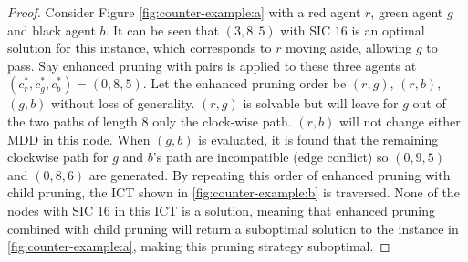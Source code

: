 \documentclass[english]{article}
\begin{document}
	\begin{proof}
		Consider Figure \ref{fig:counter-example:a} with a red agent $r$, green agent $g$ and black agent $b$. It can be seen that $(3,8,5)$ with SIC $16$ is an optimal solution for this instance, which corresponds to $r$ moving aside, allowing $g$ to pass.  Say enhanced pruning with pairs is applied to these three agents at $(c^*_r,c^*_g,c^*_b) = (0,8,5)$. Let the enhanced pruning order be $(r,g)$, $(r,b)$, $(g,b)$ without loss of generality. $(r,g)$ is solvable but will leave for $g$ out of the two paths of length $8$ only the clock-wise path. $(r,b)$ will not change either MDD in this node. When $(g,b)$ is evaluated, it is found that the remaining clockwise path for $g$ and $b$'s path are incompatible (edge conflict) so $(0,9,5)$ and $(0,8,6)$ are generated. By repeating this order of enhanced pruning with child pruning, the ICT shown in \ref{fig:counter-example:b} is traversed. None of the nodes with SIC 16 in this ICT is a solution, meaning that enhanced pruning combined with child pruning will return a suboptimal solution to the instance in \ref{fig:counter-example:a}, making this pruning strategy suboptimal.
	\end{proof}
	
\end{document}
